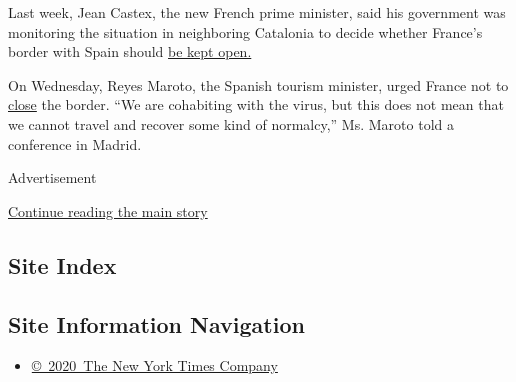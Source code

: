 Last week, Jean Castex, the new French prime minister, said his
government was monitoring the situation in neighboring Catalonia to
decide whether France's border with Spain should
\href{https://www.euroweeklynews.com/2020/07/18/breaking-france-in-crisis-talks-with-spain}{be
kept open.}

On Wednesday, Reyes Maroto, the Spanish tourism minister, urged France
not to
\href{https://www.nytimes3xbfgragh.onion/reuters/2020/07/22/world/europe/22reuters-health-coronavirus-spain.html}{close}
the border. ``We are cohabiting with the virus, but this does not mean
that we cannot travel and recover some kind of normalcy,'' Ms. Maroto
told a conference in Madrid.

Advertisement

\protect\hyperlink{after-bottom}{Continue reading the main story}

\hypertarget{site-index}{%
\subsection{Site Index}\label{site-index}}

\hypertarget{site-information-navigation}{%
\subsection{Site Information
Navigation}\label{site-information-navigation}}

\begin{itemize}
\tightlist
\item
  \href{https://help.nytimes3xbfgragh.onion/hc/en-us/articles/115014792127-Copyright-notice}{©~2020~The
  New York Times Company}
\end{itemize}

